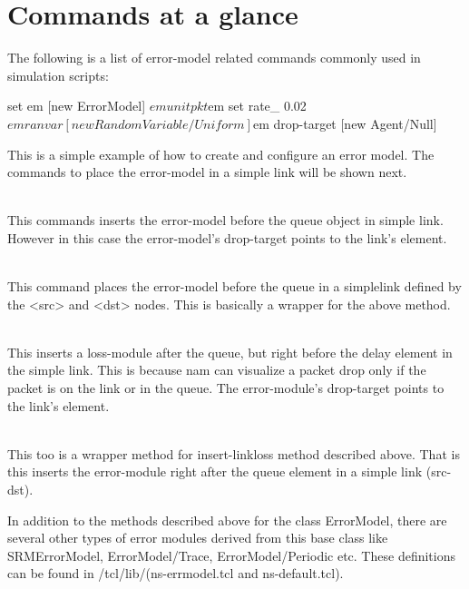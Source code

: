 \section{Commands at a glance}
\label{sec:errmodelcommand}

The following is a list of error-model related commands commonly used in
simulation scripts:

\begin{program}
set em [new ErrorModel]
$em unit pkt
$em set rate_ 0.02
$em ranvar [new RandomVariable/Uniform]
$em drop-target [new Agent/Null]
\end{program}

This is a simple example of how to create and configure an error model.
The commands to place the error-model in a simple link will be shown next.

\begin{flushleft}
\\
This commands inserts the error-model before the queue object in simple link.
However in this case the error-model's drop-target points to the link's
 element.


\\
This command places the error-model before the queue in a simplelink defined
by the <src> and <dst> nodes. This is basically a wrapper for the above method.


\\
This inserts a loss-module after the queue, but right before the delay 
element in the simple link. This is because nam can visualize a packet drop
only if the packet is on the link or in the queue. The error-module's
drop-target points to the link's  element.


\\
This too is a wrapper method for insert-linkloss method described above.
That is this inserts the error-module right after the queue element in a
simple link (src-dst).

In addition to the methods described above for the class ErrorModel, there
are several other types of error modules derived from this base class like
SRMErrorModel, ErrorModel/Trace, ErrorModel/Periodic etc. These definitions
can be found in \ns/tcl/lib/(ns-errmodel.tcl and ns-default.tcl).

\end{flushleft}


